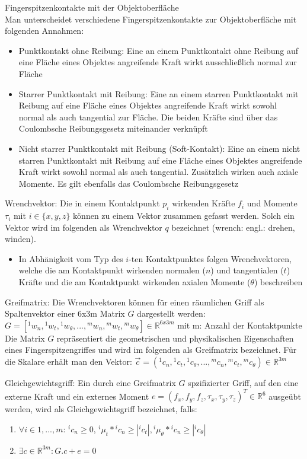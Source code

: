\documentclass[paper=a4, fontsize=11pt]{scrartcl} %
\numberwithin{equation}{section} %
\numberwithin{figure}{section} %
\numberwithin{table}{section} %
\begin{document}
Fingerspitzenkontakte mit der Objektoberfläche\\
Man unterscheidet verschiedene Fingerspitzenkontakte zur Objektoberfläche mit folgenden Annahmen:
\begin{itemize}
\item Punktkontakt ohne Reibung: Eine an einem Punktkontakt ohne Reibung auf eine Fläche eines Objektes angreifende Kraft wirkt ausschließlich normal zur Fläche
\item Starrer Punktkontakt mit Reibung: Eine an einem starren Punktkontakt mit Reibung auf eine Fläche eines Objektes angreifende Kraft wirkt sowohl normal als auch tangential zur Fläche. Die beiden Kräfte sind über das Coulombsche Reibungsgesetz miteinander verknüpft
\item Nicht starrer Punktkontakt mit Reibung (Soft-Kontakt): Eine an einem nicht starren Punktkontakt mit Reibung auf eine Fläche eines Objektes angreifende Kraft wirkt sowohl normal als auch tangential. Zusätzlich wirken auch axiale Momente. Es gilt ebenfalls das Coulombsche Reibungsgesetz
\end{itemize}

Wrenchvektor: Die in einem Kontaktpunkt $p_i$ wirkenden Kräfte $f_i$ und Momente $\tau_i$ mit $i \in \{x,y,z\}$ können zu einem Vektor zusammen gefasst werden. Solch ein Vektor wird im folgenden als Wrenchvektor $q$ bezeichnet (wrench: engl.: drehen, winden).
\begin{itemize}
\item In Abhänigkeit vom Typ des $i$-ten Kontaktpunktes folgen Wrenchvektoren, welche die am Kontaktpunkt wirkenden normalen ($n$) und tangentialen ($t$) Kräfte und die am Kontaktpunkt wirkenden axialen Momente ($\theta$) beschreiben
\end{itemize}

Greifmatrix: Die Wrenchvektoren können für einen räumlichen Griff als Spaltenvektor einer 6x3m Matrix $G$ dargestellt werden:\\
$G = [{}^1w_n,{}^1w_t,{}^1w_\theta,...,{}^mw_n,{}^mw_t, {}^mw_\theta] \in \mathbb{R}^{6x3m}$ mit m: Anzahl der Kontaktpunkte\\
Die Matrix $G$ repräsentiert die geometrischen und physikalischen Eigenschaften eines Fingerspitzengriffes und wird im folgenden als Greifmatrix bezeichnet. Für die Skalare erhält man den Vektor: $\vec{c} = ({}^1c_n, {}^1c_t, {}^1c_\theta,...,{}^mc_n,{}^mc_t,{}^mc_\theta) \in \mathbb{R}^{3m}$

Gleichgewichtsgriff: Ein durch eine Greifmatrix $G$ spzifizierter Griff, auf den eine externe Kraft und ein externes Moment $e=(f_x,f_y,f_z,\tau_x,\tau_y,\tau_z)^T \in \mathbb{R}^6$ ausgeübt werden, wird als Gleichgewichtsgriff bezeichnet, falls:
\begin{enumerate}
\item $\forall i \in {1,...,m}$: ${}^ic_n \ge 0$, ${}^i \mu_t * {}^ic_n \ge |{}^ic_t|, {}^i\mu_\theta * {}^i c_n \ge |{}^i c_\theta|$
\item $\exists c \in \mathbb{R}^{3m}: G.c + e = 0$
\end{enumerate}
\end{document}

